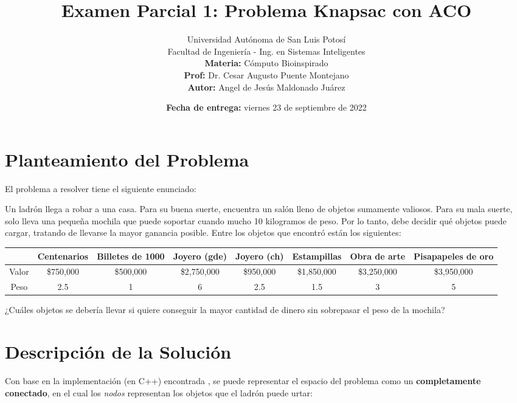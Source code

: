 \documentclass[12pt, a4paper]{article}
\title{\vspace{-3cm}Examen Parcial 1: Problema Knapsac con ACO}
\author{
    Universidad Autónoma de San Luis Potosí\\ 
    Facultad de Ingeniería - Ing. en Sistemas Inteligentes\\ 
    \textbf{Materia:} Cómputo Bioinspirado \\
    \textbf{Prof:} Dr. Cesar Augusto Puente Montejano  \\
    \textbf{Autor:} Angel de Jesús Maldonado Juárez
}
\date{\textbf{Fecha de entrega:} viernes 23 de septiembre de 2022}
\begin{document}
\maketitle

\section{Planteamiento del Problema}\label{title1}
El problema a resolver tiene el siguiente enunciado:

Un ladrón llega a robar a una casa. Para su buena suerte, encuentra un salón lleno de objetos
sumamente valiosos. Para su mala suerte, solo lleva una pequeña mochila que puede soportar cuando
mucho 10 kilogramos de peso. Por lo tanto, debe decidir qué objetos puede cargar, tratando de
llevarse la mayor ganancia posible. Entre los objetos que encontró están los siguientes:

\begin{table}[!ht]
    \begin{adjustbox}{width=\textwidth}
        \begin{tabular}{|c|c|c|c|c|c|c|c|}
            \rowcolor{yellow}
            \hline
                  & Centenarios & Billetes de 1000 & Joyero (gde) & Joyero (ch) & Estampillas & Obra de arte & Pisapapeles de oro \\
            \hline
            Valor & \$750,000   & \$500,000        & \$2,750,000  & \$950,000   & \$1,850,000 & \$3,250,000  & \$3,950,000        \\
            \hline
            Peso  & 2.5         & 1                & 6            & 2.5         & 1.5         & 3            & 5                  \\
            \hline
        \end{tabular}
    \end{adjustbox}
\end{table}

¿Cuáles objetos se debería llevar si quiere conseguir la mayor cantidad de dinero sin sobrepasar el
peso de la mochila?

\section{Descripción de la Solución}
Con base en la implementación (en C++) encontrada \cite{qcloud1223_2022}, se puede representar el espacio del problema como un \textbf{completamente conectado}, en el cual los \emph{nodos} representan los objetos que el ladrón puede urtar:
\end{document}
